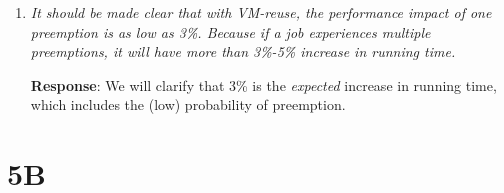 \documentclass{article}
\newcommand{\resp}[1]{\textbf{Response}: #1}
\newcommand{\revmade}[1]{\textbf{Revision Made}: #1}
\begin{document}
\begin{enumerate}

\item \emph{It should be made clear that with VM-reuse, the performance impact of one preemption is as low as 3\%. Because if a job experiences multiple preemptions, it will have more than 3\%-5\% increase in running time.}

\resp{We will clarify that 3\% is the \emph{expected} increase in running time, which includes the (low) probability of preemption.  }


\end{enumerate}

\section{5B}
\end{document}
